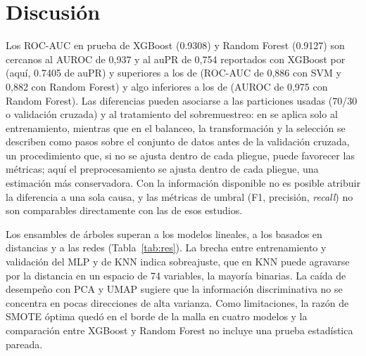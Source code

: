 \documentclass[conference]{IEEEtran}
\begin{document}
\section{Discusión}
Los ROC-AUC en prueba de XGBoost (0.9308) y Random Forest (0.9127) son cercanos al AUROC de 0,937 y al auPR de 0,754 reportados con XGBoost por \cite{tanvir2023} (aquí, 0.7405 de auPR) y superiores a los de \cite{alamuri2026} (ROC-AUC de 0,886 con SVM y 0,882 con Random Forest) y algo inferiores a los de \cite{satu2023} (AUROC de 0,975 con Random Forest). Las diferencias pueden asociarse a las particiones usadas (70/30 o validación cruzada) y al tratamiento del sobremuestreo: en \cite{tanvir2023} se aplica solo al entrenamiento, mientras que en \cite{satu2023} el balanceo, la transformación y la selección se describen como pasos sobre el conjunto de datos antes de la validación cruzada, un procedimiento que, si no se ajusta dentro de cada pliegue, puede favorecer las métricas; aquí el preprocesamiento se ajusta dentro de cada pliegue, una estimación más conservadora. Con la información disponible no es posible atribuir la diferencia a una sola causa, y las métricas de umbral (F1, precisión, \emph{recall}) no son comparables directamente con las de esos estudios.

Los ensambles de árboles superan a los modelos lineales, a los basados en distancias y a las redes (Tabla~\ref{tab:res}). La brecha entre entrenamiento y validación del MLP y de KNN indica sobreajuste, que en KNN puede agravarse por la distancia en un espacio de 74 variables, la mayoría binarias. La caída de desempeño con PCA y UMAP sugiere que la información discriminativa no se concentra en pocas direcciones de alta varianza. Como limitaciones, la razón de SMOTE óptima quedó en el borde de la malla en cuatro modelos y la comparación entre XGBoost y Random Forest no incluye una prueba estadística pareada.
\end{document}
